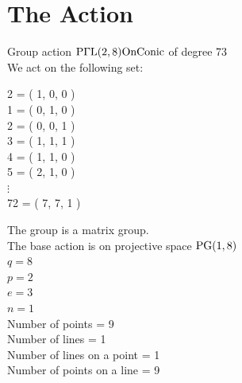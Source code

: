 \section*{The Action}
Group action ${\rm P}\Gamma {\rm L}(2,8) {\rm OnConic}$ of degree 73\\
We act on the following set:\\
\begin{multicols}{2}
 = ( 1, 0, 0 )\\
1 = ( 0, 1, 0 )\\
2 = ( 0, 0, 1 )\\
3 = ( 1, 1, 1 )\\
4 = ( 1, 1, 0 )\\
5 = ( 2, 1, 0 )\\
$\vdots$\\
72 = ( 7, 7, 1 )\\
\end{multicols}
The group is a matrix group.\\
The base action is on projective space ${\rm PG}(1, 8)$\\
$q = 8$\\
$p = 2$\\
$e = 3$\\
$n = 1$\\
Number of points = 9\\
Number of lines = 1\\
Number of lines on a point = 1\\
Number of points on a line = 9\\
